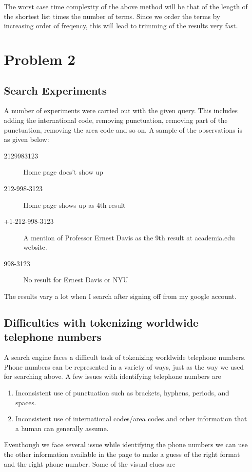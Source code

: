 \documentclass{article}
\begin{document}
The worst case time complexity of the above method will be that of the length of the shortest list times the number of terms.  Since we order the terms by increasing order of freqency, this will lead to trimming of the results very fast.

\section[Problem 2]{Problem 2}
\subsection{Search Experiments}
A number of experiments were carried out with the given query.  This includes adding the international code, removing punctuation, removing part of the punctuation, removing the area code and so on.  A sample of the observations is as given below:
\begin{description}
  \item[2129983123] Home page does't show up
  \item[212-998-3123] Home page shows up as 4th result %
  \item[+1-212-998-3123] A mention of Professor Ernest Davis as the 9th result at academia.edu website.
  \item[998-3123] No result for Ernest Davis or NYU
\end{description}
The results vary a lot when I search after signing off from my google account.

\subsection{Difficulties with tokenizing worldwide telephone numbers}
A search engine faces a difficult task of tokenizing worldwide telephone numbers.  Phone numbers can be represented in a variety of ways, just as the way we used for searching above.  A few issues with identifying telephone numbers are
\begin{enumerate}
  \item Inconsistent use of punctuation such as brackets, hyphens, periods, and spaces. 
  \item Inconsistent use of international codes/area codes and other information that a human can generally assume.
\end{enumerate}

Eventhough we face several issue while identifying the phone numbers we can use the other information available in the page to make a guess of the right format and the right phone number.  Some of the visual clues are
\end{document}
